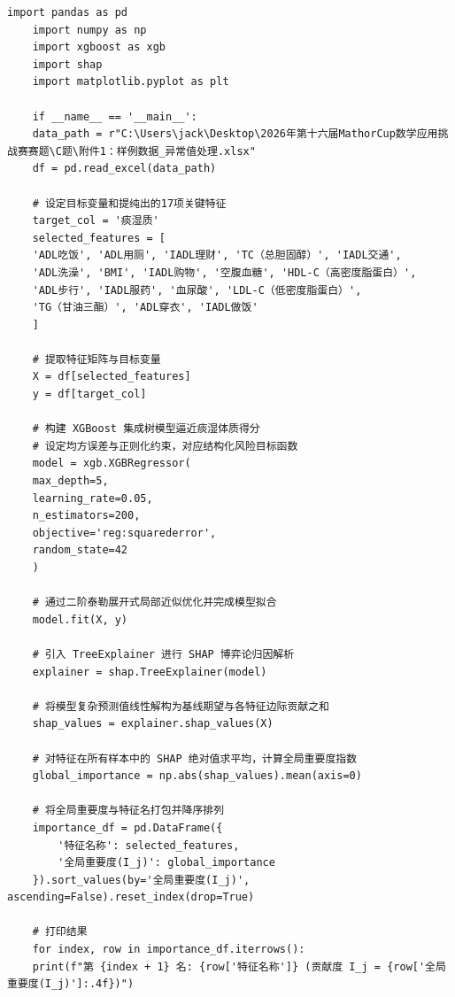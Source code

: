 \documentclass[12pt]{article}
\begin{document}
\begin{lstlisting}[caption={XGBoost-SHAP特征重要度}, label={code:xgb_shap}]
	import pandas as pd
	import numpy as np
	import xgboost as xgb
	import shap
	import matplotlib.pyplot as plt
	
	if __name__ == '__main__':
	data_path = r"C:\Users\jack\Desktop\2026年第十六届MathorCup数学应用挑战赛赛题\C题\附件1：样例数据_异常值处理.xlsx"
	df = pd.read_excel(data_path)
	
	# 设定目标变量和提纯出的17项关键特征
	target_col = '痰湿质'
	selected_features = [
	'ADL吃饭', 'ADL用厕', 'IADL理财', 'TC（总胆固醇）', 'IADL交通',
	'ADL洗澡', 'BMI', 'IADL购物', '空腹血糖', 'HDL-C（高密度脂蛋白）',
	'ADL步行', 'IADL服药', '血尿酸', 'LDL-C（低密度脂蛋白）',
	'TG（甘油三酯）', 'ADL穿衣', 'IADL做饭'
	]
	
	# 提取特征矩阵与目标变量
	X = df[selected_features]
	y = df[target_col]
	
	# 构建 XGBoost 集成树模型逼近痰湿体质得分
	# 设定均方误差与正则化约束，对应结构化风险目标函数
	model = xgb.XGBRegressor(
	max_depth=5,
	learning_rate=0.05,
	n_estimators=200,
	objective='reg:squarederror',
	random_state=42
	)
	
	# 通过二阶泰勒展开式局部近似优化并完成模型拟合
	model.fit(X, y)
	
	# 引入 TreeExplainer 进行 SHAP 博弈论归因解析
	explainer = shap.TreeExplainer(model)
	
	# 将模型复杂预测值线性解构为基线期望与各特征边际贡献之和
	shap_values = explainer.shap_values(X)
	
	# 对特征在所有样本中的 SHAP 绝对值求平均，计算全局重要度指数
	global_importance = np.abs(shap_values).mean(axis=0)
	
	# 将全局重要度与特征名打包并降序排列
	importance_df = pd.DataFrame({
		'特征名称': selected_features,
		'全局重要度(I_j)': global_importance
	}).sort_values(by='全局重要度(I_j)', ascending=False).reset_index(drop=True)
	
	# 打印结果
	for index, row in importance_df.iterrows():
	print(f"第 {index + 1} 名: {row['特征名称']} (贡献度 I_j = {row['全局重要度(I_j)']:.4f})")
\end{lstlisting}
\end{document}
